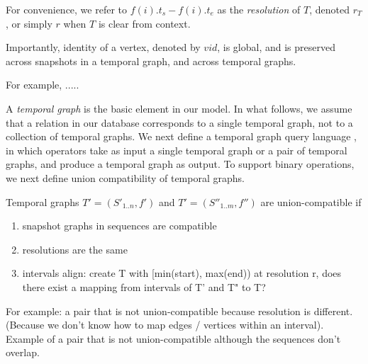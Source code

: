 For convenience, we refer to $ f(i).t_s - f(i).t_e$ as the {\em
  resolution} of $T$, denoted $r_T$, or simply $r$ when $T$ is clear
from context.

Importantly, identity of a vertex, denoted by $vid$, is global, and is
preserved across snapshots in a temporal graph, and across temporal
graphs.

For example, ..... 

A {\em temporal graph} is the basic element in our model.  In what
follows, we assume that a relation in our database corresponds to a
single temporal graph, not to a collection of temporal graphs.  We
next define a temporal graph query language \ql, in which operators
take as input a single temporal graph or a pair of temporal graphs,
and produce a temporal graph as output.  To support binary operations,
we next define union compatibility of temporal graphs.

\begin{definition}
\label{def:tuc}
Temporal graphs $T' = (S'_{1..n}, f')$ and $T' = (S''_{1..m}, f'')$ are
union-compatible if
\begin{enumerate}
\item snapshot graphs in sequences are compatible
\item resolutions are the same
\item intervals align: create T with [min(start), max(end)) at
  resolution r, does there exist a mapping from intervals of T' and T"
  to T?
\end{enumerate}
\end{definition}

For example: a pair that is not union-compatible because resolution is
different. (Because we don't know how to map edges / vertices within
an interval).  Example of a pair that is not union-compatible although
the sequences don't overlap.


